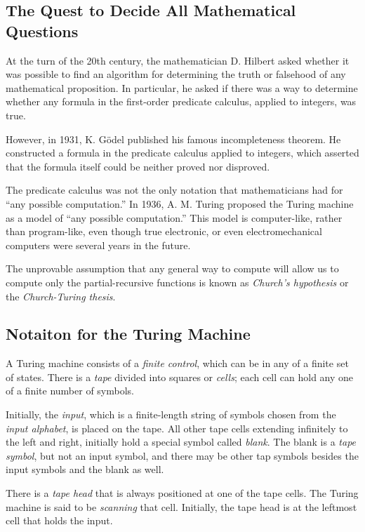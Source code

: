 \documentclass[]{article}
\begin{document}
\subsection*{The Quest to Decide All Mathematical Questions}
At the turn of the 20th century, the mathematician D. Hilbert asked whether
it was possible to find an algorithm for determining the truth or falsehood
of any mathematical proposition. In particular, he asked if there was a way
to determine whether any formula in the first-order predicate calculus,
applied to integers, was true.

However, in 1931, K. G\"odel published his famous incompleteness theorem.
He constructed a formula in the predicate calculus applied to integers,
which asserted that the formula itself could be neither proved nor
disproved.

The predicate calculus was not the only notation that mathematicians had
for ``any possible computation.'' In 1936, A. M. Turing proposed the Turing
machine as a model of ``any possible computation.'' This model is
computer-like, rather than program-like, even though true electronic, or
even electromechanical computers were several years in the future.

The unprovable assumption that any general way to compute will allow us to
compute only the partial-recursive functions is known as
\emph{Church's hypothesis} or the \emph{Church-Turing thesis}.

\subsection*{Notaiton for the Turing Machine}
A Turing machine consists of a \emph{finite control}, which can be in any
of a finite set of states. There is a \emph{tape} divided into squares or
\emph{cells}; each cell can hold any one of a finite number of symbols.

Initially, the \emph{input}, which is a finite-length string of symbols
chosen from the \emph{input alphabet}, is placed on the tape. All other
tape cells extending infinitely to the left and right, initially hold a
special symbol called \emph{blank}. The blank is a \emph{tape symbol}, but
not an input symbol, and there may be other tap symbols besides the input
symbols and the blank as well.

There is a \emph{tape head} that is always positioned at one of the tape
cells. The Turing machine is said to be \emph{scanning} that cell.
Initially, the tape head is at the leftmost cell that holds the input.
\end{document}
